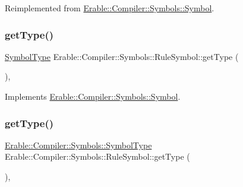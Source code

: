 Reimplemented from \mbox{\hyperlink{class_erable_1_1_compiler_1_1_symbols_1_1_symbol_a71aeae736d2ec43f0880341d53bbcc2c}{Erable\+::\+Compiler\+::\+Symbols\+::\+Symbol}}.

\mbox{\label{class_erable_1_1_compiler_1_1_symbols_1_1_rule_symbol_a0497f4aa633b946b4a418d5bde3e96fd}} 
\subsubsection{\texorpdfstring{getType()}{getType()}\hspace{0.1cm}{\footnotesize\ttfamily [1/2]}}
{\footnotesize\ttfamily \mbox{\hyperlink{namespace_erable_1_1_compiler_1_1_symbols_a3b60ec10cda0920ec4368128361b8320}{Symbol\+Type}} Erable\+::\+Compiler\+::\+Symbols\+::\+Rule\+Symbol\+::get\+Type (\begin{DoxyParamCaption}{ }\end{DoxyParamCaption})\hspace{0.3cm}{\ttfamily [override]}, {\ttfamily [virtual]}}



Implements \mbox{\hyperlink{class_erable_1_1_compiler_1_1_symbols_1_1_symbol_a63b41d0942e5d65288fa3fc9d466ab43}{Erable\+::\+Compiler\+::\+Symbols\+::\+Symbol}}.

\mbox{\label{class_erable_1_1_compiler_1_1_symbols_1_1_rule_symbol_af232c9c3213aad7b033b402ceb8ef388}} 
\subsubsection{\texorpdfstring{getType()}{getType()}\hspace{0.1cm}{\footnotesize\ttfamily [2/2]}}
{\footnotesize\ttfamily \mbox{\hyperlink{namespace_erable_1_1_compiler_1_1_symbols_a3b60ec10cda0920ec4368128361b8320}{Erable\+::\+Compiler\+::\+Symbols\+::\+Symbol\+Type}} Erable\+::\+Compiler\+::\+Symbols\+::\+Rule\+Symbol\+::get\+Type (\begin{DoxyParamCaption}{ }\end{DoxyParamCaption})\hspace{0.3cm}{\ttfamily [override]}, {\ttfamily [virtual]}}



